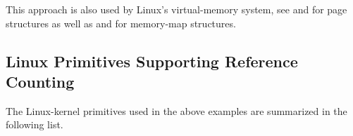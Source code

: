 This approach is also used by Linux's virtual-memory system,
see  and  for
page structures as well as  and 
for memory-map structures.

\subsection{Linux Primitives Supporting Reference Counting}
\label{sec:together:Linux Primitives Supporting Reference Counting}

The Linux-kernel primitives used in the above examples are
summarized in the following list.

